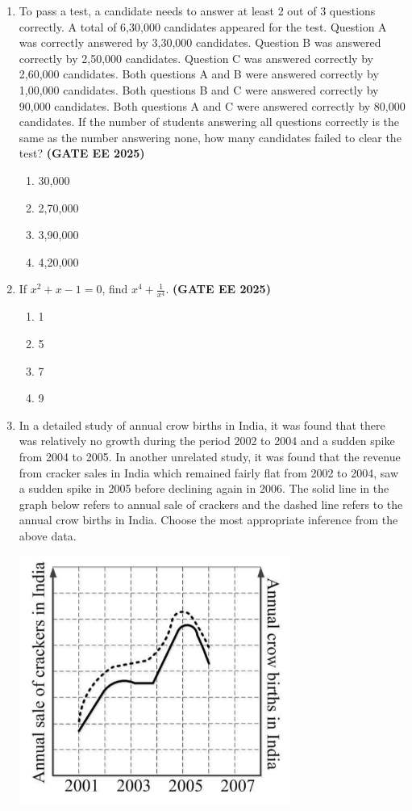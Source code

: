 \documentclass[journal,12pt,onecolumn]{IEEEtran}
\theoremstyle{remark}
\begin{document}
\begin{enumerate}
\item To pass a test, a candidate needs to answer at least 2 out of 3 questions correctly. A total of 6,30,000 candidates appeared for the test. Question A was correctly answered by 3,30,000 candidates. Question B was answered correctly by 2,50,000 candidates. Question C was answered correctly by 2,60,000 candidates. Both questions A and B were answered correctly by 1,00,000 candidates. Both questions B and C were answered correctly by 90,000 candidates. Both questions A and C were answered correctly by 80,000 candidates. If the number of students answering all questions correctly is the same as the number answering none, how many candidates failed to clear the test?
\hfill \textbf{(GATE EE 2025)} \begin{enumerate}
    \item 30,000
    \item 2,70,000
    \item 3,90,000
    \item 4,20,000
\end{enumerate}


\item If $x^{2}+x-1=0$, find $x^4+\frac{1}{x^4}$.
\hfill \textbf{(GATE EE 2025)} \begin{enumerate}
    \item 1
    \item 5
    \item 7
    \item 9
\end{enumerate}


\item In a detailed study of annual crow births in India, it was found that there was relatively no growth during the period 2002 to 2004 and a sudden spike from 2004 to 2005. In another unrelated study, it was found that the revenue from cracker sales in India which remained fairly flat from 2002 to 2004, saw a sudden spike in 2005 before declining again in 2006. The solid line in the graph below refers to annual sale of crackers and the dashed line refers to the annual crow births in India. Choose the most appropriate inference from the above data.


\begin{center}
\includegraphics[width=0.7\textwidth]{figs/10.png}
\end{center}




\end{enumerate}
\end{document}
